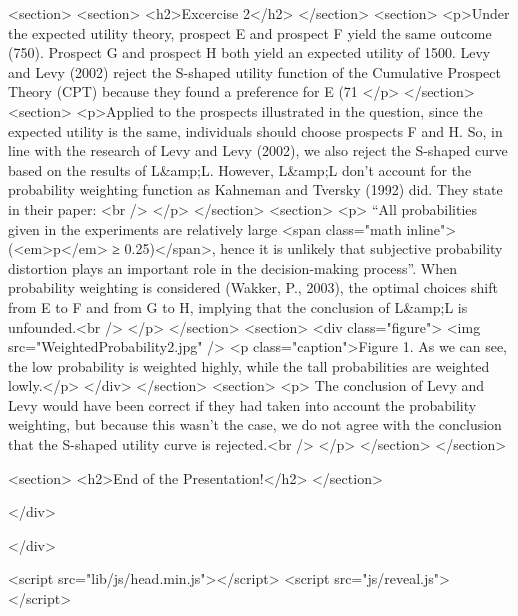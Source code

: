 				<section>
					<section>
						<h2>Excercise 2</h2>
					</section>
					<section>
						<p>Under the expected utility theory, prospect E and prospect F yield the same outcome (750). Prospect G and prospect H both yield an expected utility of 1500. Levy and Levy (2002) reject the S-shaped utility function of the Cumulative Prospect Theory (CPT) because they found a preference for E (71%
						</p>
					</section>
					<section>
						<p>Applied to the prospects illustrated in the question, since the expected utility is the same, individuals should choose prospects F and H. So, in line with the research of Levy and Levy (2002), we also reject the S-shaped curve based on the results of L&amp;L. However, L&amp;L don’t account for the probability weighting function as Kahneman and Tversky (1992) did. They state in their paper:  <br />
							</p>
						</section>
						<section>
							<p> “All probabilities given in the experiments are relatively large <span class="math inline">(<em>p</em> ≥ 0.25)</span>, hence it is unlikely that subjective probability distortion plays an important role in the decision-making process”. When probability weighting is considered (Wakker, P., 2003), the optimal choices shift from E to F and from G to H, implying that the conclusion of L&amp;L is unfounded.<br />
							</p>
						</section>
						<section>
							<div class="figure">
								<img src="WeightedProbability2.jpg" />
								<p class="caption">Figure 1. As we can see, the low probability is weighted highly, while the tall probabilities are weighted lowly.</p>
							</div>
						</section>
						<section>
							<p> The conclusion of Levy and Levy would have been correct if they had taken into account the probability weighting, but because this wasn’t the case, we do not agree with the conclusion that the S-shaped utility curve is rejected.<br />
							</p>
						</section>
				</section>

				<section>
						<h2>End of the Presentation!</h2>
				</section>

			</div>

		</div>

		<script src="lib/js/head.min.js"></script>
		<script src="js/reveal.js"></script>

